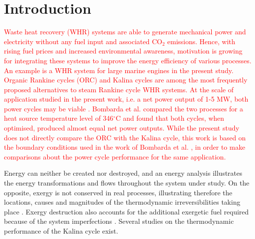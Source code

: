 \documentclass[final,times,3p]{elsarticle}
\begin{document}
%
\linenumbers



\section{Introduction}
\label{sec:introduction}
	

\begin{table}[!ht]
  \begin{framed}
  \footnotesize
    \printnomenclature
  \end{framed}
\end{table}


\textcolor{red}{Waste heat recovery (WHR) systems are able to generate mechanical power and electricity without any fuel input and associated CO$_2$ emissions. Hence, with rising fuel prices and increased environmental awareness, motivation is growing for integrating these systems to improve the energy efficiency of various processes. An example is a WHR system for large marine engines in the present study. Organic Rankine cycles (ORC) and Kalina cycles are among the most frequently proposed alternatives to steam Rankine cycle WHR systems. At the scale of application studied in the present work, i.e. a net power output of 1-5 MW, both power cycles may be viable \cite{Tchanche20113963,Jonsson2001c}. Bombarda et al. \cite{Bombarda2010b} compared the two processes for a heat source temperature level of 346$^\circ$C and found that both cycles, when optimised, produced almost equal net power outputs. While the present study does not directly compare the ORC with the Kalina cycle, this work is based on the boundary conditions used in the work of Bombarda et al. \cite{Bombarda2010b}, in order to make comparisons about the power cycle performance for the same application.}

Energy can neither be created nor destroyed, and an energy analysis illustrates the energy transformations and flows throughout the system under study. On the opposite, exergy is not conserved in real processes, illustrating therefore the locations, causes and magnitudes of the thermodynamic irreversibilities taking place \cite{BejanAdrian;TsatsaronisGeorge;Moran1996,Bejan2006}. Exergy destruction also accounts for the additional exergetic fuel required because of the system imperfections \cite{Wall1988,Kotas1980,Kotas1980a,Kotas1995}. Several studies on the thermodynamic performance of the Kalina cycle exist. 
\end{document}

